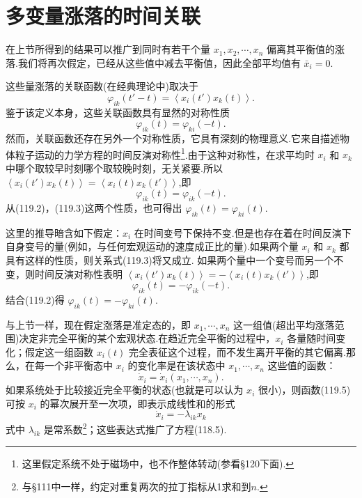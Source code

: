 \section{多变量涨落的时间关联}

在上节所得到的结果可以推广到同时有若干个量 $x_1,x_2,\cdots,x_n$ 偏离其平衡值的涨落.我们将再次假定，已经从这些值中减去平衡值，因此全部平均值有 $\bar{x}_i=0$.

这些量涨落的关联函数(在经典理论中)取决于
\begin{equation}
  \varphi_{ik}(t'-t)=\left\langle x_i(t')x_k(t)\right\rangle.
\end{equation}
鉴于该定义本身，这些关联函数具有显然的对称性质
\begin{equation}
  \varphi_{ik}(t)=\varphi_{ki}(-t).
\end{equation}
然而，关联函数还存在另外一个对称性质，它具有深刻的物理意义.它来自描述物体粒子运动的力学方程的时间反演对称性\footnote{这里假定系统不处于磁场中，也不作整体转动(参看§120下面).}.由于这种对称性，在求平均时 $x_i$ 和 $x_k$ 中哪个取较早时刻哪个取较晚时刻，无关紧要.所以 $\left\langle x_i(t')x_k(t)\right\rangle=\left\langle x_i(t)x_k(t')\right\rangle$,即
\begin{equation}
  \varphi_{ik}(t)=\varphi_{ik}(-t).
\end{equation}
从(119.2)，(119.3)这两个性质，也可得出 $\varphi_{ik}(t)=\varphi_{ki}(t)$.

这里的推导暗含如下假定：$x_i$ 在时间变号下保持不变.但是也存在着在时间反演下自身变号的量(例如，与任何宏观运动的速度成正比的量).如果两个量 $x_i$ 和 $x_k$ 都具有这样的性质，则关系式(119.3)将又成立. 如果两个量中一个变号而另一个不变，则时间反演对称性表明 $\left\langle x_i(t')x_k(t)\right\rangle=-\left\langle x_i(t)x_k(t')\right\rangle$,即
\begin{equation}
  \varphi_{ik}(t)=-\varphi_{ik}(-t).
\end{equation}
结合(119.2)得 $\varphi_{ik}(t)=-\varphi_{ki}(t)$.

与上节一样，现在假定涨落是准定态的，即 $x_1,\cdots,x_n$ 这一组值(超出平均涨落范围)决定非完全平衡的某个宏观状态.在趋近完全平衡的过程中，$x_i$ 各量随时间变化；假定这一组函数 $x_i(t)$ 完全表征这个过程，而不发生离开平衡的其它偏离.那么，在每一个非平衡态中 $x_i$ 的变化率是在该状态中 $x_1,\cdots,x_n$ 这些值的函数：
\begin{equation}
  \dot{x}_i=\dot{x}_i(x_1,\cdots,x_n).
\end{equation}
如果系统处于比较接近完全平衡的状态(也就是可以认为 $x_i$ 很小)，则函数(119.5)可按 $x_i$ 的幂次展开至一次项，即表示成线性和的形式
\begin{equation}
  \dot{x}_i=-\lambda_{ik}x_k
\end{equation}
式中 $\lambda_{ik}$ 是常系数\footnote{与§111中一样，约定对重复两次的拉丁指标从1求和到$n$.}；这些表达式推广了方程(118.5).

